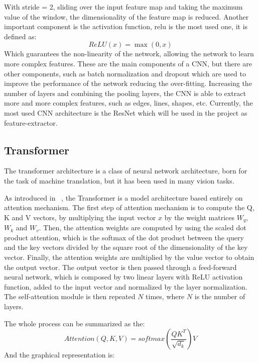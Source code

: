 With stride = 2, sliding over the input feature map and taking the maximum value of the window, the dimensionality of the feature map is reduced.
Another important component is the activation function, \gls{relu} is the most used one, it is defined as:
\begin{equation}[H]
    ReLU(x) = \max(0, x)
    \label{eq:expression-relu}
\end{equation}
Which guarantees the non-linearity of the network, allowing the network to learn more complex features.
These are the main components of a CNN, but there are other components, such as batch normalization and dropout which are used to improve the performance of the network reducing the over-fitting.
Increasing the number of layers and combining the pooling layers, the CNN is able to extract more and more complex features, such as edges, lines, shapes, etc.
Currently, the most used CNN architecture is the ResNet which will be used in the project as feature-extractor.

\subsection{Transformer}\label{subsec:transformer}
The transformer architecture is a class of neural network architecture, born for the task of machine translation, but it has been used in many vision tasks.

As introduced in ~\cite{transformer_paper}, the Transformer is a model architecture based entirely on attention mechanism.
The first step of attention mechanism is to compute the Q, K and V vectors, by multiplying the input vector $x$ by the weight matrices $W_q$, $W_k$ and $W_v$.
Then, the attention weights are computed by using the scaled dot product attention, which is the softmax of the dot product between the query and the key vectors divided by the square root of the dimensionality of the key vector.
Finally, the attention weights are multiplied by the value vector to obtain the output vector.
The output vector is then passed through a feed-forward neural network, which is composed by two linear layers with ReLU activation function, added to the input vector and normalized by the layer normalization.
The self-attention module is then repeated $N$ times, where $N$ is the number of layers.

The whole process can be summarized as the:
\begin{equation}[H]
    Attention(Q, K, V) = softmax\left(\frac{QK^T}{\sqrt{d_k}}\right)V
    \label{eq:expression-scaled-dot-product}
\end{equation}
And the graphical representation is:

